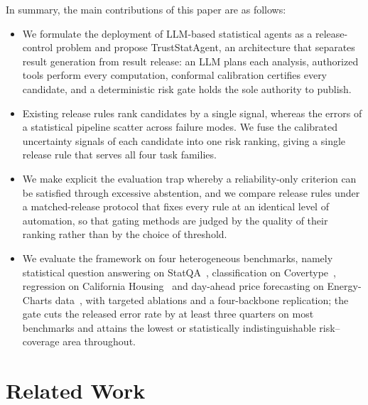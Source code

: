 \documentclass[preprint,12pt,authoryear]{elsarticle}
\begin{document}
{In summary, the main contributions of this paper are as follows:
\begin{itemize}
  \item We formulate the deployment of LLM-based statistical agents as a release-control problem and propose TrustStatAgent, an architecture that separates result generation from result release: an LLM plans each analysis, authorized tools perform every computation, conformal calibration certifies every candidate, and a deterministic risk gate holds the sole authority to publish.
  \item Existing release rules rank candidates by a single signal, whereas the errors of a statistical pipeline scatter across failure modes. We fuse the calibrated uncertainty signals of each candidate into one risk ranking, giving a single release rule that serves all four task families.
  \item We make explicit the evaluation trap whereby a reliability-only criterion can be satisfied through excessive abstention, and we compare release rules under a matched-release protocol that fixes every rule at an identical level of automation, so that gating methods are judged by the quality of their ranking rather than by the choice of threshold.
  \item We evaluate the framework on four heterogeneous benchmarks, namely statistical question answering on StatQA~\citep{zhu2024large}, classification on Covertype~\citep{blackard1999comparative}, regression on California Housing~\citep{pace1997sparse} and day-ahead price forecasting on Energy-Charts data~\citep{energycharts2025}, with targeted ablations and a four-backbone replication; the gate cuts the released error rate by at least three quarters on most benchmarks and attains the lowest or statistically indistinguishable risk--coverage area throughout.
\end{itemize}
}


\section{Related Work}
\end{document}

